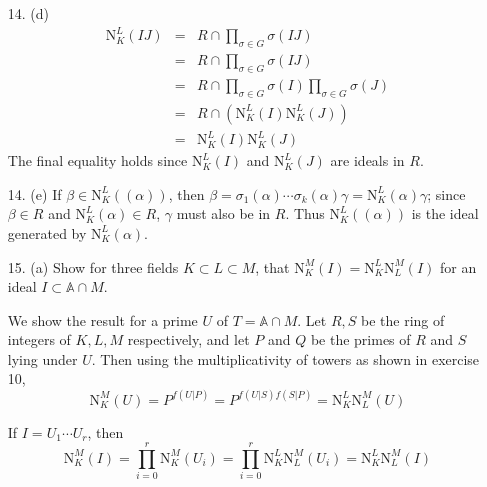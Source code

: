 \documentclass{article}
\newcommand{\norm}[0]{\text{N}}
\newcommand{\ringofintegers}[1]{\mathbb{A} \cap #1}
\begin{document}
\begin{enumerate}
\item[14. (d)] \begin{eqnarray*}\norm^{L}_{K}(IJ) &=& R \cap \prod_{\sigma \in G} \sigma(IJ) \\&=& R \cap \prod_{\sigma \in G} \sigma(IJ)\\ &=& R \cap \prod_{\sigma \in G} \sigma(I) \prod_{\sigma \in G} \sigma(J) \\ &=& R \cap (\norm^{L}_{K}(I)\norm^{L}_{K}(J)) \\ &=& \norm^{L}_{K}(I)\norm^{L}_{K}(J)\end{eqnarray*}
The final equality holds since $\norm^{L}_{K}(I)$ and $\norm^{L}_{K}(J)$ are ideals in $R$.

\item[14. (e)] If $\beta \in \norm^{L}_{K}((\alpha))$, then $\beta = \sigma_1(\alpha) \cdots \sigma_k(\alpha) \gamma = \norm^{L}_{K}(\alpha)\gamma$; since $\beta \in R$ and $\norm^{L}_{K}(\alpha) \in R$, $\gamma$ must also be in $R$.  Thus $\norm^{L}_{K}((\alpha))$ is the ideal generated by $\norm^{L}_{K}(\alpha)$.

\item[15. (a)] Show for three fields $K \subset L \subset M$, that $\norm^{M}_{K}(I) = \norm^{L}_{K} \norm^{M}_{L}(I)$ for an ideal $I \subset \ringofintegers{M}$.

We show the result for a prime $U$ of $T = \ringofintegers{M}$.  Let $R, S$ be the ring of integers of $K, L, M$ respectively, and let $P$ and $Q$ be the primes of $R$ and $S$ lying under $U$.  Then using the multiplicativity of towers as shown in exercise 10, \[ \norm^{M}_{K}(U) = P^{f(U|P)} = P^{f(U|S)f(S|P)} = \norm^{L}_{K} \norm^{M}_{L}(U) \]

If $I = U_1 \cdots U_r$, then \[ \norm^{M}_{K}(I) = \prod^{r}_{i = 0} \norm^{M}_{K}(U_{i}) = \prod^{r}_{i = 0} \norm^{L}_{K}\norm^{M}_{L}(U_{i}) = \norm^{L}_{K} \norm^{M}_{L}(I) \]


\end{enumerate}
\end{document}
